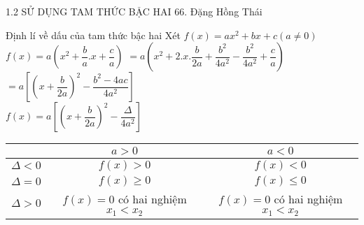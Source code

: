 
\begin{frame}{1.2 SỬ DỤNG TAM THỨC BẬC HAI \hspace{3cm}  66. Đặng Hồng Thái} 
     \begin{block}{Định lí về dấu của tam thức bậc hai}
            \pause
        Xét $f(x)=ax^2+bx+c  (a\ne 0)$ \\  \pause
        \vspace{0,4cm}
        $f(x)=a\left(x^2+\dfrac{b}{a}.x+\dfrac{c}{a}\right)$ 
        $=a\left(x^2+2.x.\dfrac{b}{2a}+\dfrac{b^2}{4a^2}-\dfrac{b^2}{4a^2}+\dfrac{c}{a}\right)$ \pause
        $=a\left[\left(x+\dfrac{b}{2a}\right)^2-\dfrac{b^2-4ac}{4a^2}\right]$  \\
        \vspace{0,4cm} \pause
        $f(x)=a\left[\left(x+\dfrac{b}{2a}\right)^2-\dfrac{\Delta}{4a^2}\right]$ \\
        \pause
        \begin{center}
             \begin{tabular}{|c|c|c|}
             \hline
             & $a>0$ & $a<0$  \\
             \hline
             $\Delta<0$ & $f(x)>0$ & $f(x)<0$ \\  
             \hline
             \pause
             $\Delta = 0$ & $f(x) \geq 0$ & $f(x) \leq 0$ \\ 
             \hline
             \pause
             $\Delta>0$ & $f(x)=0$ có hai nghiệm $x_1<x_2$ & $f(x)=0$ có hai nghiệm $x_1<x_2$ \\
             \hline
            \end{tabular}
        \end{center}
    \end{block}
\end{frame}


